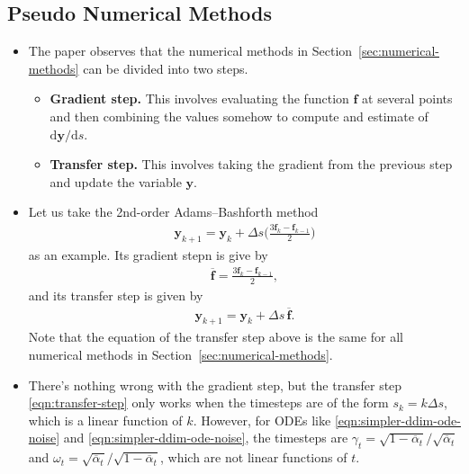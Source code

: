 \documentclass[10pt]{article}
\newcommand{\dee}{\mathrm{d}}
\newcommand{\ve}[1]{\mathbf{#1}}
\newcommand{\ov}[1]{\overline{#1}}
\begin{document}
\subsection{Pseudo Numerical Methods}

\begin{itemize}  
  \item The paper observes that the numerical methods in Section~\ref{sec:numerical-methods} can be divided into two steps. 
  \begin{itemize}
    \item {\bf Gradient step.} This involves evaluating the function $\ve{f}$ at several points and then combining the values somehow to compute and estimate of $\dee\ve{y} / \dee s$.
    \item {\bf Transfer step.} This involves taking the gradient from the previous step and update the variable $\ve{y}$.
  \end{itemize}

  \item Let us take the 2nd-order Adams--Bashforth method
  \begin{align*}
    \ve{y}_{k+1} = \ve{y}_k + \Delta s \bigg( \frac{3 \ve{f}_k - \ve{f}_{k-1}}{2} \bigg)
  \end{align*}
  as an example. Its gradient stepn is give by
  \begin{align*}
    \ov{\ve{f}} = \frac{3 \ve{f}_k - \ve{f}_{k-1}}{2},
  \end{align*}
  and its transfer step is given by
  \begin{align} \label{eqn:transfer-step}
    \ve{y}_{k+1} = \ve{y}_k + \Delta s\, \ov{\ve{f}}.
  \end{align}
  Note that the equation of the transfer step above is the same for all numerical methods in Section~\ref{sec:numerical-methods}.

  \item There's nothing wrong with the gradient step, but the transfer step \eqref{eqn:transfer-step} only works when the timesteps are of the form $s_k = k \Delta s$, which is a linear function of $k$. However, for ODEs like \eqref{eqn:simpler-ddim-ode-noise} and \eqref{eqn:simpler-ddim-ode-noise}, the timesteps are $\gamma_t = \sqrt{1 - \ov{\alpha}_t}/\sqrt{\ov{\alpha}_t}$ and $\omega_t = \sqrt{\ov{\alpha}_t} / \sqrt{1 - \ov{\alpha}_t}$, which are not linear functions of $t$.
  

\end{itemize}
\end{document}
